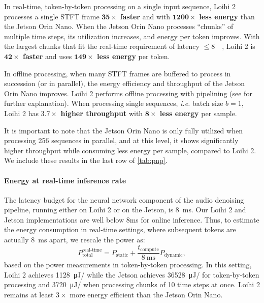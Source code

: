 In real-time, token-by-token processing on a single input sequence, Loihi 2 processes a single STFT frame $\mathbf{35\times}$ \textbf{faster} and with $\mathbf{1200\times}$ \textbf{less energy} than the Jetson Orin Nano. %
When the Jetson Orin Nano processes ``chunks'' of multiple time steps, its utilization increases, and energy per token improves. With the largest chunks that fit the real-time requirement of latency $\leq$\qty{8}{\milli\sec}, Loihi 2 is \textbf{$\mathbf{42}\times$ faster} and uses \textbf{$\mathbf{149} \times$ less energy} per token.

In offline processing, when many STFT frames are buffered to process in succession (or in parallel), the energy efficiency and throughput of the Jetson Orin Nano improves. Loihi 2 performs offline processing with pipelining (see  for further explanation). When processing single sequences, \textit{i.e.} batch size $b=1$, Loihi 2 has \textbf{$\mathbf{3.7} \times$ higher throughput} with \textbf{$\mathbf{8}\times$ less energy} per sample. 

It is important to note that the Jetson Orin Nano is only fully utilized when processing \qty{256}{} sequences in parallel, and at this level, it shows significantly higher throughput while consuming less energy per sample, compared to Loihi 2. We include these results in the last row of \autoref{tab:pnp}.

\paragraph{Energy at real-time inference rate}
The latency budget for the neural network component of the audio denoising pipeline, running either on Loihi 2 or on the Jetson, is \qty{8}{\milli\s}.
Our Loihi 2 and Jetson implementations are well below 8ms for online inference.
%
Thus, to estimate the energy consumption in real-time settings, where subsequent tokens are actually \qty{8}{\milli\s} apart, we rescale the power as:
\begin{equation*}
    P_\text{total}^\text{real-time} =  P_\text{static} + \frac{t_\text{compute}}{\qty{8}{\milli\s}} P_\text{dynamic},
\end{equation*}
based on the power measurements in token-by-token processing.
In this setting, Loihi 2 achieves \qty{1128}{\micro\joule/\token} while the Jetson achieves \qty{36528}{\micro\joule/\token} for token-by-token processing and \qty{3720}{\micro\joule/\token} when processing chunks of 10 time steps at once. Loihi 2 remains at least $3 \times$ more energy efficient than the Jetson Orin Nano.

